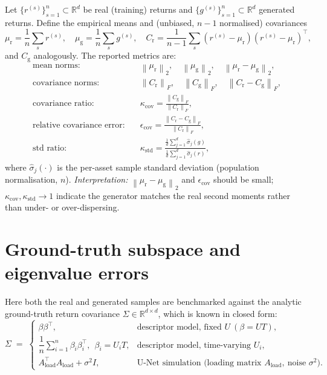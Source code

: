\documentclass[11pt]{article}
\newcommand{\R}{\mathbb{R}}
\newcommand{\norm}[1]{\left\lVert #1 \right\rVert}
\newcommand{\fro}[1]{\norm{#1}_{F}}
\newcommand{\twonorm}[1]{\norm{#1}_{2}}
\newcommand{\T}{^{\!\top}}
\begin{document}
Let $\{r^{(s)}\}_{s=1}^{n}\subset\R^{d}$ be real (training) returns and
$\{g^{(s)}\}_{s=1}^{n}\subset\R^{d}$ generated returns. Define the empirical means
and (unbiased, $n-1$ normalised) covariances
\begin{equation}
  \mu_{\mathrm{r}} = \frac1n\sum_{s} r^{(s)},\quad
  \mu_{\mathrm{g}} = \frac1n\sum_{s} g^{(s)},\quad
  C_{\mathrm{r}} = \frac{1}{n-1}\sum_{s}(r^{(s)}-\mu_{\mathrm r})(r^{(s)}-\mu_{\mathrm r})\T,
\end{equation}
and $C_{\mathrm g}$ analogously. The reported metrics are:
\begin{align}
  \text{mean norms:}\quad
    &\twonorm{\mu_{\mathrm r}},\quad \twonorm{\mu_{\mathrm g}},\quad
     \twonorm{\mu_{\mathrm r}-\mu_{\mathrm g}}, \\[2pt]
  \text{covariance norms:}\quad
    &\fro{C_{\mathrm r}},\quad \fro{C_{\mathrm g}},\quad
     \fro{C_{\mathrm r}-C_{\mathrm g}}, \\[2pt]
  \text{covariance ratio:}\quad
    &\kappa_{\mathrm{cov}} = \frac{\fro{C_{\mathrm g}}}{\fro{C_{\mathrm r}}}, \\[2pt]
  \text{relative covariance error:}\quad
    &\epsilon_{\mathrm{cov}} = \frac{\fro{C_{\mathrm r}-C_{\mathrm g}}}{\fro{C_{\mathrm r}}}, \\[2pt]
  \text{std ratio:}\quad
    &\kappa_{\mathrm{std}} = \frac{\frac1d\sum_{j=1}^{d}\widehat\sigma_j(g)}
                                  {\frac1d\sum_{j=1}^{d}\widehat\sigma_j(r)},
\end{align}
where $\widehat\sigma_j(\cdot)$ is the per-asset sample standard deviation
(population normalisation, $n$). \emph{Interpretation:} $\twonorm{\mu_{\mathrm r}-\mu_{\mathrm g}}$
and $\epsilon_{\mathrm{cov}}$ should be small; $\kappa_{\mathrm{cov}},\kappa_{\mathrm{std}}\to 1$
indicate the generator matches the real second moments rather than under- or
over-dispersing.

\section{Ground-truth subspace and eigenvalue errors}
\label{sec:gt}

Here both the real and generated samples are benchmarked against the analytic
ground-truth return covariance $\Sigma\in\R^{d\times d}$, which is known in closed
form:
\begin{equation}
  \Sigma \;=\;
  \begin{cases}
    \beta\beta\T, & \text{descriptor model, fixed } U\ (\beta=UT),\\[4pt]
    \dfrac1n\sum_{i=1}^{n}\beta_i\beta_i\T,\ \ \beta_i = U_i T,
      & \text{descriptor model, time-varying } U_i,\\[8pt]
    A_{\mathrm{load}}\T A_{\mathrm{load}} + \sigma^2 I,
      & \text{U-Net simulation (loading matrix } A_{\mathrm{load}},\ \text{noise } \sigma^2).
  \end{cases}
\end{equation}
\end{document}
